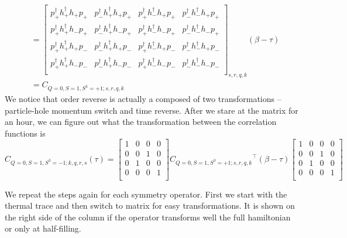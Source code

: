 \renewcommand{\dcor}[4]{p_{#4}^\dagger h_{#3}^\dagger h_{#2} p_{#1}}

\begin{equation*}
  \begin{aligned}
    &= \left[ 
    \begin{array}{cccc}
      \dcor{+}{+}{+}{+} & \dcor{+}{+}{+}{-} & \dcor{+}{+}{-}{+} & \dcor{+}{+}{-}{-} \\
      \dcor{+}{-}{+}{+} & \dcor{+}{-}{+}{-} & \dcor{+}{-}{-}{+} & \dcor{+}{-}{-}{-} \\
      \dcor{-}{+}{+}{+} & \dcor{-}{+}{+}{-} & \dcor{-}{+}{-}{+} & \dcor{-}{+}{-}{-} \\
      \dcor{-}{-}{+}{+} & \dcor{-}{-}{+}{-} & \dcor{-}{-}{-}{+} & \dcor{-}{-}{-}{-} \\
    \end{array} \right]_{s,r,q,k} (\beta-\tau) \\
    &= C_{Q=0,S=1,S^3=+1;s,r,q,k}
  \end{aligned}
\end{equation*}
We notice that order reverse is actually a composed of two transformations -- particle-hole momentum switch and time reverse. After we stare at the matrix for an hour, we can figure out what the transformation between the correlation functions is
\begin{equation*}
  C_{Q=0,S=1,S^3=-1;k,q,r,s} (\tau) =
  \left[ {\begin{array}{cccc}
    1 & 0 & 0 & 0 \\
    0 & 0 & 1 & 0 \\
    0 & 1 & 0 & 0 \\
    0 & 0 & 0 & 1 \\
  \end{array} } \right]
  {C_{Q=0,S=1,S^3=+1;s,r,q,k}}^\top (\beta-\tau)
  \left[ {\begin{array}{cccc}
    1 & 0 & 0 & 0 \\
    0 & 0 & 1 & 0 \\
    0 & 1 & 0 & 0 \\
    0 & 0 & 0 & 1 \\
  \end{array} } \right]
\end{equation*}

We repeat the steps again for each symmetry operator. First we start with the thermal trace and then switch to matrix for easy transformations. It is shown on the right side of the column if the operator transforms well the full hamiltonian or only at half-filling.\\

